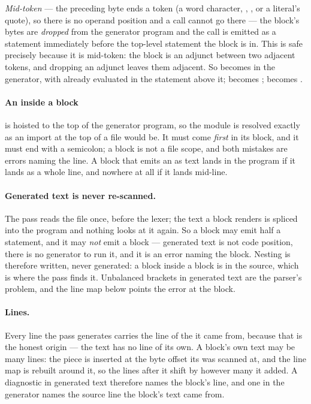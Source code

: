 \emph{Mid-token} --- the preceding byte ends a token (a word character, \ic{)},
\ic{]},  or a literal's quote), so there is no operand position and a call
cannot go there --- the block's bytes are \emph{dropped} from the generator
program and the call is emitted as a statement immediately before the top-level
statement the block is in. This is safe precisely because it is mid-token: the
block is an adjunct between two adjacent tokens, and dropping an adjunct leaves
them adjacent. So  becomes
 in the generator, with  already
evaluated in the statement above it;  becomes
;  becomes .

\paragraph{An  inside a block} is hoisted to the top of the generator
program, so the module is resolved exactly as an import at the top of a file
would be. It must come \emph{first} in its block, and it must end with a
semicolon; a block is not a file scope, and both mistakes are errors naming the
line. A block that emits an  as text lands in the program if it lands
as a whole line, and nowhere at all if it lands mid-line.

\paragraph{Generated text is never re-scanned.} The pass reads the file once,
before the lexer; the text a block renders is spliced into the program and
nothing looks at it again. So a block may emit half a statement, and it may
\emph{not} emit a \ic{\#\{ \ldots \}\#} block --- generated text is not code
position, there is no generator to run it, and it is an error naming the
block. Nesting is therefore written, never generated: a block inside a block is
in the source, which is where the pass finds it. Unbalanced brackets in
generated text are the parser's problem, and the line map below points the error
at the block.

\paragraph{Lines.} Every line the pass generates carries the line of the
\ic{\#\{} it came from, because that is the honest origin --- the text has no
line of its own. A block's own text may be many lines: the piece is inserted at
the byte offset its \ic{\#\{} was scanned at, and the line map is rebuilt around
it, so the lines after it shift by however many it added. A diagnostic in
generated text therefore names the block's line, and one in the generator names
the source line the block's text came from.

